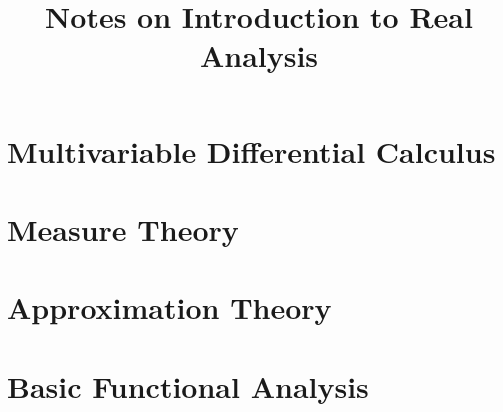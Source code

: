 \documentclass[12pt]{article}
\begin{document}
\title{Notes on Introduction to Real Analysis}
\author{}
\date{}
\maketitle

\tableofcontents
\section{Multivariable Differential Calculus}

\newpage
\section{Measure Theory}

\newpage
\section{Approximation Theory}

\newpage
\section{Basic Functional Analysis}

\end{document}

